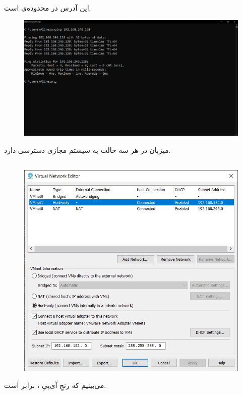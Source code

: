 \documentclass{article}
\begin{document}
این آدرس در محدوده‌ی  است.
\begin{figure}[H]
    \centering
    \includegraphics[width=1.0\textwidth]{figures/4c.jpg}
    \caption
	{
	}
    \label{fig:fig1}
\end{figure}
میزبان در هر سه حالت به سیستم مجازی دسترسی دارد.


\subsection{}
\begin{figure}[H]
    \centering
    \includegraphics[width=1.0\textwidth]{figures/5a.jpg}
    \caption
	{
	}
    \label{fig:fig1}
\end{figure}
می‌بینیم که رنجِ آی‌پیِ ، برابر  است.
\end{document}
